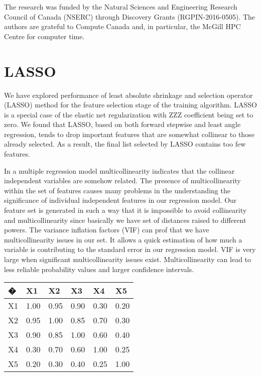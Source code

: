 \documentclass[aps,prl,reprint,amsmath,amssymb,nature]{revtex4-1}
\begin{document}
The research was funded by the Natural Sciences and Engineering Research Council of Canada (NSERC) through Discovery
Grants (RGPIN-2016-0505). The authors are grateful to Compute Canada and, in particular, the McGill HPC Centre for computer time.




\newpage
\clearpage
\setcounter{figure}{0}
\setcounter{page}{1}
\renewcommand{\thefigure}{S\arabic{figure}}


\section{LASSO} 

We have explored performance of least absolute 
shrinkage and selection operator (LASSO) method for the feature 
selection stage of the training algorithm. LASSO is a special case of 
the elastic net regularization with ZZZ coefficient being set to zero. 
We found that LASSO, based on both forward stepwise and least angle 
regression, tends to drop important features that are somewhat collinear 
to those already selected. As a result, the final list selected by LASSO 
contains too few features.

In a multiple regression model multicollinearity indicates that the 
collinear independent variables are somehow related. The presence of 
multicollinearity within the set of features causes many problems in the 
understanding the significance of individual independent features in our 
regression model. Our feature set is generated in such a way that it is 
impossible to avoid collinearity and multicollinearity since basically 
we have set of distances raised to different powers. The variance 
inflation factors (VIF) can prof that we have multicollinearity issues 
in our set. It allows a quick estimation of how much a variable is 
contributing to the standard error in our regression model. VIF is very 
large when significant multicollinearity issues exist. Multicollinearity 
can lead to less reliable probability values and larger confidence 
intervals.

\begin{table}[h]
\centering
\begin{tabular}{|l|l|l|l|l|l|}
\hline
� & X1 & X2 & X3 & X4 & X5 \\
\hline
X1 & 1.00 & 0.95 & 0.90 & 0.30 & 0.20 \\
\hline
X2 & 0.95 & 1.00 & 0.85 & 0.70 & 0.30 \\
\hline
X3 & 0.90 & 0.85 & 1.00 & 0.60 & 0.40 \\
\hline
X4 & 0.30 & 0.70 & 0.60 & 1.00 & 0.25 \\
\hline
X5 & 0.20 & 0.30 & 0.40 & 0.25 & 1.00 \\
\hline
\end{tabular}
\end{table}
\end{document}
